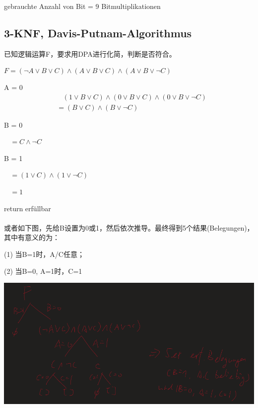 \documentclass[a4paper]{article}    %
\begin{document}
gebrauchte Anzahl von Bit = 9 Bitmultiplikationen

\subsection{3-KNF, Davis-Putnam-Algorithmus}

已知逻辑运算F，要求用DPA进行化简，判断是否符合。

$F = (\neg A \vee B \vee C) \wedge (A \vee B \vee C) \wedge (A \vee B \vee \neg C)$

A = 0
\begin{equation}
\begin{split}
    & \ \ \ \ (1 \vee B \vee C) \wedge (0 \vee B \vee C) \wedge (0\vee B \vee \neg C)\\
    &= (B\vee C)\wedge (B\vee \neg C)
\end{split}
\end{equation}

B = 0

$\ \ \ \  = C \wedge \neg C$

B = 1

$ \ \ \ \ = (1\vee C)\wedge (1\vee \neg C)$

$ \ \ \ \ = 1$

return erfüllbar
\\
\\
\indent 或者如下图，先给B设置为0或1，然后依次推导。最终得到5个结果(Belegungen)，其中有意义的为：

(1) 当B=1时，A/C任意；

(2) 当B=0, A=1时，C=1


\begin{center}
    \includegraphics[scale=0.5]{45.png}
\end{center}
\end{document}
